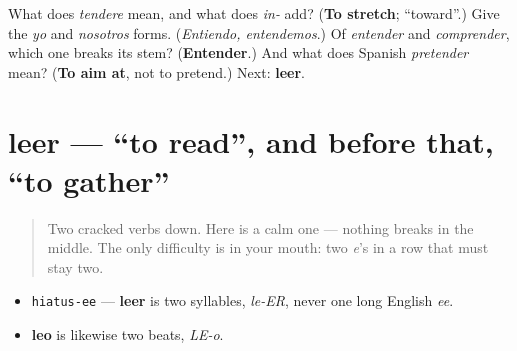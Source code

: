 \begin{tcolorbox}[breakable,colback=teal!4,colframe=teal!35!black,title={Before you move on}]
What does \emph{tendere} mean, and what does \emph{in-} add? (\textbf{To stretch}; \textquotedblleft{}toward\textquotedblright{}.) Give the \emph{yo} and \emph{nosotros} forms. (\emph{Entiendo, entendemos}.) Of \emph{entender} and \emph{comprender}, which one breaks its stem? (\textbf{Entender}.) And what does Spanish \emph{pretender} mean? (\textbf{To aim at}, not to pretend.) Next: \textbf{leer}.
\end{tcolorbox}
\section[leer]{leer — \textquotedblleft{}to read\textquotedblright{}, and before that, \textquotedblleft{}to gather\textquotedblright{}}

\label{lesson:ES-C34-leer}



\begin{quote}
Two cracked verbs down. Here is a calm one — nothing breaks in the middle. The only difficulty is in your mouth: two \emph{e}'s in a row that must stay two.
\end{quote}

\begin{sounds}
\begin{itemize}
\raggedright
  \item \texttt{hiatus-ee} — \textbf{leer} is two syllables, \emph{le-ER}, never one long English \emph{ee}.
  \item \textbf{leo} is likewise two beats, \emph{LE-o}.
\end{itemize}
\end{sounds}

